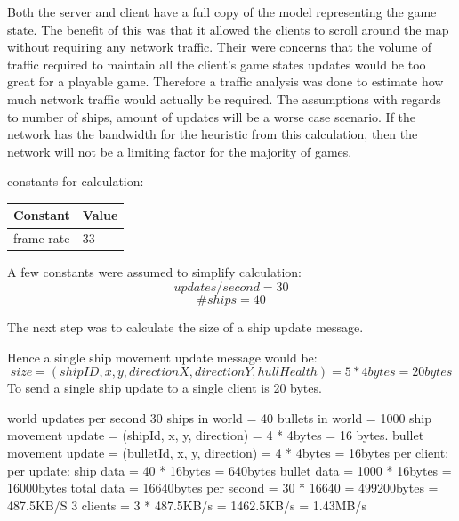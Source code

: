 Both the server and client have a full copy of the model representing the game state. 
The benefit of this was that it allowed the clients to scroll around the map without requiring any network traffic.
Their were concerns that the volume of traffic required to maintain all the client's game states updates would be too great for a playable game.
Therefore a traffic analysis was done to estimate how much network traffic would actually be required.
The assumptions with regards to number of ships, amount of updates will be a worse case scenario. 
If the network has the bandwidth for the heuristic from this calculation, then the network will not be a limiting factor for the majority of games.

constants for calculation:
\begin{center}
    \begin{tabular}{| l | l |}
    \hline
    Constant & Value \\ \hline
    frame rate & 33 \\ 
    \hline
    \end{tabular}
\end{center}



A few constants were assumed to simplify calculation:
$$ updates / second = 30 $$
$$ \#ships = 40 $$

The next step was to calculate the size of a ship update message.

Hence a single ship movement update message would be:
$$ size = (shipID, x, y, directionX, directionY, hullHealth) = 5 * 4 bytes = 20 bytes $$
To send a single ship update to a single client is 20 bytes.



			world updates per second 30
			ships in world = 40
			bullets in world = 1000
			ship movement update = (shipId, x, y, direction) = 4 * 4bytes = 16 bytes.
			bullet movement update = (bulletId, x, y, direction) = 4 * 4bytes = 16bytes
			per client:
				per update:
 					ship data = 40 * 16bytes = 640bytes
					bullet data = 1000 * 16bytes = 16000bytes
					total data = 16640bytes
			    per second = 30 * 16640 = 499200bytes = 487.5KB/S
			3 clients = 3 * 487.5KB/s = 1462.5KB/s = 1.43MB/s



